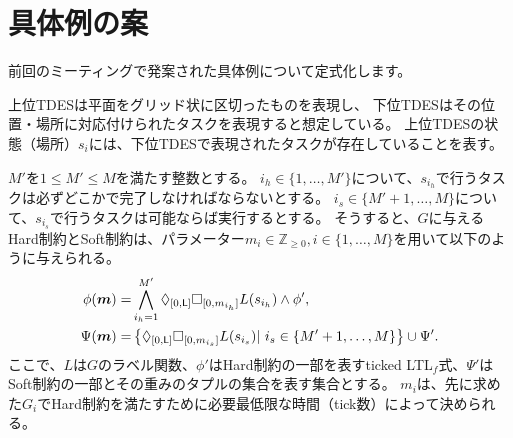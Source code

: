 \documentclass[ 10pt]{jsarticle}
\newcommand{\Len}{{\sf L}}
\begin{document}
\section{具体例の案}
前回のミーティングで発案された具体例について定式化します。

上位TDESは平面をグリッド状に区切ったものを表現し、
下位TDESはその位置・場所に対応付けられたタスクを表現すると想定している。
上位TDESの状態（場所）$s_i$には、下位TDESで表現されたタスクが存在していることを表す。

$M'$を$1\leq M'\leq M$を満たす整数とする。
$i_h\in\{1,\ldots, M'\}$について、$s_{i_h}$で行うタスクは必ずどこかで完了しなければならないとする。
$i_s\in\{M'+1,\ldots, M\}$について、$s_{i_s}$で行うタスクは可能ならば実行するとする。
そうすると、$G$に与えるHard制約とSoft制約は、パラメーター$m_i\in \mathbb{Z}_{\geq 0},i\in\{1,\ldots,M\}$を用いて以下のように与えられる。
\begin{align}
\phi(\bm{m})=&\bigwedge_{i_h=1}^{M'}\Diamond_{[0,\Len]}\Box_{[0,m_{i_h}]}L(s_{i_h}) \land \phi',\\
\Psi(\bm{m})=&\left\{\Diamond_{[0,\Len]}\Box_{[0,m_{i_s}]}L(s_{i_s})|\ i_s\in\left\{M'+1,\ldots, M\right\}\right\}\cup \Psi'.
\end{align}
ここで、$L$は$G$のラベル関数、$\phi'$はHard制約の一部を表すticked LTL${}_f$式、$\Psi'$はSoft制約の一部とその重みのタプルの集合を表す集合とする。
$m_i$は、先に求めた$G_i$でHard制約を満たすために必要最低限な時間（tick数）によって決められる。




 
\end{document}
